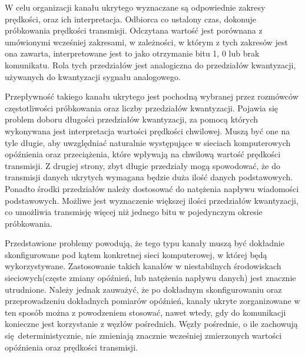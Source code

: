 \documentclass[a4paper, twoside, 12pt]{report}
\begin{document}
        W celu organizacji kanału ukrytego wyznaczane są odpowiednie zakresy prędkości, oraz ich
        interpretacja. Odbiorca co ustalony czas, dokonuje próbkowania prędkości
        transmisji. Odczytana wartość jest porównana z umówionymi wcześniej zakresami,
        w zależności, w którym z tych zakresów jest ona zawarta, interpretowane jest to
        jako otrzymanie bitu 1, 0 lub brak komunikatu. Rola tych przedziałów jest analogiczna
        do przedziałów kwantyzacji, używanych do kwantyzacji sygnału analogowego.

        Przepływność takiego kanału ukrytego jest pochodną wybranej przez rozmówców
        częstotliwości próbkowania oraz liczby przedziałów kwantyzacji. Pojawia się
        problem doboru długości przedziałów kwantyzacji, za pomocą których wykonywana
        jest interpretacja wartości
        prędkości chwilowej. Muszą być one na tyle długie, aby uwzględniać naturalnie
        występujące w sieciach komputerowych opóźnienia oraz przeciążenia, które wpływają
        na chwilową wartość prędkości transmisji. Z drugiej strony, zbyt długie przedziały
        mogą spowodować, że do transmisji danych ukrytych wymagana będzie duża ilość danych
        podstawowych. Ponadto środki przedziałów należy dostosować do natężenia
        napływu wiadomości podstawowych. Możliwe jest wyznaczenie większej ilości
        przedziałów kwantyzacji, co umożliwia transmisję więcej niż jednego bitu w pojedynczym
        okresie próbkowania.

        Przedstawione problemy powodują, że tego typu kanały muszą być dokładnie
        skonfigurowane pod kątem konkretnej sieci komputerowej, w której będą wykorzystywane.
        Zastosowanie takich kanałów w niestabilnych środowiskach sieciowych(częste zmiany
        opóźnień, lub natężenia napływu danych) jest znacznie utrudnione. Należy jednak
        zauważyć, że po dokładnym skonfigurowaniu oraz przeprowadzeniu dokładnych
        pomiarów opóźnień, kanały ukryte zorganizowane w ten sposób można z powodzeniem
        stosować, nawet wtedy, gdy do komunikacji konieczne jest korzystanie z węzłów pośrednich.
        Węzły pośrednie, o ile zachowują się deterministycznie, nie zmieniają znacznie wcześniej
        zmierzonych wartości opóźnienia oraz prędkości transmisji.
\end{document}
